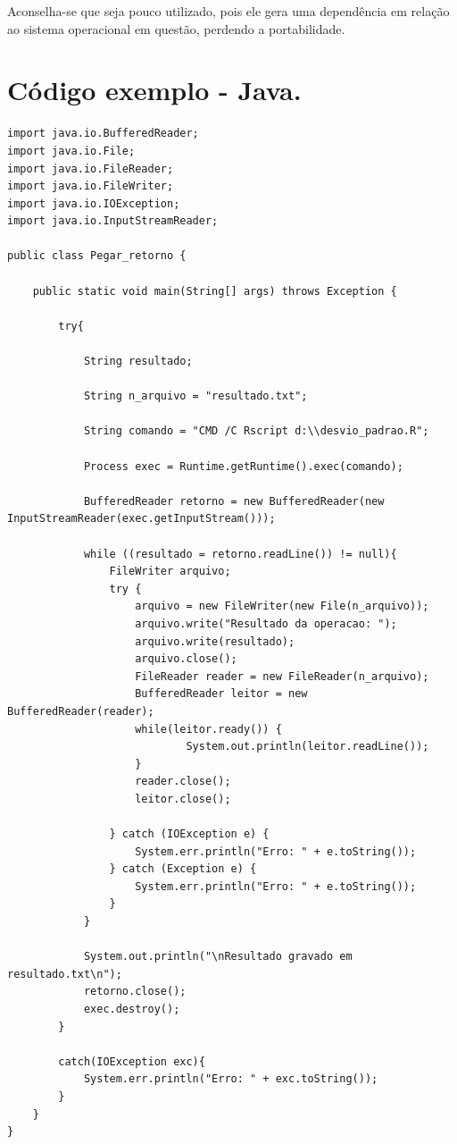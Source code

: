 \documentclass[14pt, a4paper]{article}
\begin{document}
Aconselha-se que seja pouco utilizado, pois ele gera uma dependência em relação ao sistema operacional em questão, perdendo a portabilidade.

\section{Código exemplo - Java.}%

\begin{lstlisting}
import java.io.BufferedReader;
import java.io.File;
import java.io.FileReader;
import java.io.FileWriter;
import java.io.IOException;
import java.io.InputStreamReader;

public class Pegar_retorno {

    public static void main(String[] args) throws Exception {
        
        try{

            String resultado; 
            
            String n_arquivo = "resultado.txt";
            
            String comando = "CMD /C Rscript d:\\desvio_padrao.R";
            
            Process exec = Runtime.getRuntime().exec(comando);
        
            BufferedReader retorno = new BufferedReader(new InputStreamReader(exec.getInputStream()));
          
            while ((resultado = retorno.readLine()) != null){
                FileWriter arquivo;
				try {
                    arquivo = new FileWriter(new File(n_arquivo));
                    arquivo.write("Resultado da operacao: ");
                    arquivo.write(resultado);
                    arquivo.close();
                    FileReader reader = new FileReader(n_arquivo);
                    BufferedReader leitor = new BufferedReader(reader);
                    while(leitor.ready()) {
                            System.out.println(leitor.readLine());
                    }
                    reader.close();
                    leitor.close();
                    
                } catch (IOException e) {
                    System.err.println("Erro: " + e.toString());
				} catch (Exception e) {
                    System.err.println("Erro: " + e.toString());
				}
            }
            
            System.out.println("\nResultado gravado em resultado.txt\n");
            retorno.close();
            exec.destroy();
        }
        
        catch(IOException exc){
            System.err.println("Erro: " + exc.toString());
        }
    }        
}
\end{lstlisting}
\end{document}
